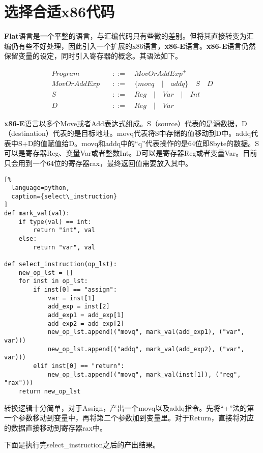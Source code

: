 \section{选择合适x86代码}

\textbf{Flat}语言是一个平整的语言，与汇编代码只有些微的差别。但将其直接转变为汇编仍有些不好处理，因此引入一个扩展的x86语言，\textbf{x86-E}语言。\textbf{x86-E}语言仍然保留变量的设定，同时引入寄存器的概念。其语法如下。

\begin{equation}
\begin{aligned}
  \label{eq:4}
   Program \quad &::= \quad { MovOrAddExp }^+ \\
   MovOrAddExp \quad &::= \quad \{ movq \quad | \quad addq \} \quad S \quad  D  \\
   S \quad &::= \quad Reg \quad | \quad Var \quad | \quad Int \\
   D \quad &::=  \quad Reg \quad | \quad Var
\end{aligned}
\end{equation}

\textbf{x86-E}语言以多个Move或者Add表达式组成。S（source）代表的是源数据，D（destination）代表的是目标地址。movq代表将S中存储的值移动到D中。addq代表中S+D的值赋值给D。movq和addq中的“q”代表操作的是64位即8byte的数据。S可以是寄存器Reg、变量Var或者整数Int。D可以是寄存器Reg或者变量Var。目前只会用到一个64位的寄存器rax，最终返回值需要放入其中。

\begin{lstlisting}[%
  language=python,
  caption={select\_instruction}
]
def mark_val(val):
    if type(val) == int:
        return "int", val
    else:
        return "var", val

def select_instruction(op_lst):
    new_op_lst = []
    for inst in op_lst:
        if inst[0] == "assign":
            var = inst[1]
            add_exp = inst[2]
            add_exp1 = add_exp[1]
            add_exp2 = add_exp[2]
            new_op_lst.append(("movq", mark_val(add_exp1), ("var", var)))
            new_op_lst.append(("addq", mark_val(add_exp2), ("var", var)))
        elif inst[0] == "return":
            new_op_lst.append(("movq", mark_val(inst[1]), ("reg", "rax")))
    return new_op_lst
\end{lstlisting}

转换逻辑十分简单，对于Assign，产出一个movq以及addq指令。先将“+”法的第一个参数移动到变量中，再将第二个参数加到变量里。对于Return，直接将对应的数据直接移动到寄存器rax中。

下面是执行完select\_instruction之后的产出结果。

